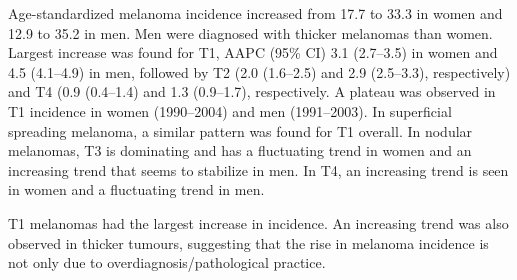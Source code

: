 \documentclass[
  11pt,
  a4paper,
]{article}
\begin{document}
Age-standardized melanoma incidence increased from 17.7 to 33.3 in women
and 12.9 to 35.2 in men. Men were diagnosed with thicker melanomas than
women. Largest increase was found for T1, AAPC (95\% CI) 3.1 (2.7--3.5)
in women and 4.5 (4.1--4.9) in men, followed by T2 (2.0 (1.6--2.5) and
2.9 (2.5--3.3), respectively) and T4 (0.9 (0.4--1.4) and 1.3 (0.9--1.7),
respectively. A plateau was observed in T1 incidence in women
(1990--2004) and men (1991--2003). In superficial spreading melanoma, a
similar pattern was found for T1 overall. In nodular melanomas, T3 is
dominating and has a fluctuating trend in women and an increasing trend
that seems to stabilize in men. In T4, an increasing trend is seen in
women and a fluctuating trend in men.

T1 melanomas had the largest increase in incidence. An increasing trend
was also observed in thicker tumours, suggesting that the rise in
melanoma incidence is not only due to overdiagnosis/pathological
practice.
\end{document}
